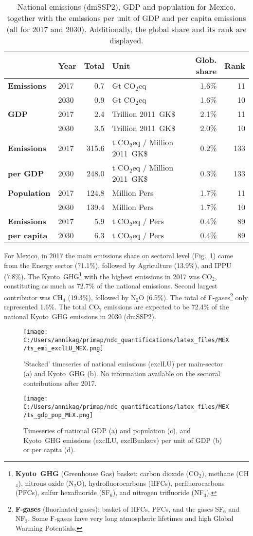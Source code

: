 \documentclass[12pt]{article}
\begin{document}
 \begin{table}[htbp]
 \centering
 \caption{National emissions (dmSSP2), GDP and population for Mexico, together with the emissions per unit of GDP and per capita emissions (all for 2017 and 2030). 
 Additionally, the global share and its rank are displayed.}
 \label{tab:overview}
 \begin{tabular}{l || l r l r r}
 \bfseries  & \bfseries Year & \bfseries Total & \bfseries Unit & \bfseries Glob. share & \bfseries Rank \tabularnewline \hline \hline
 \bfseries Emissions & 2017 & 0.7 & Gt CO$_2$eq & 1.6\% & 11 \tabularnewline 
 \bfseries  & 2030 & 0.9 & Gt CO$_2$eq & 1.6\% & 10 \tabularnewline \hline
 \bfseries GDP & 2017 & 2.4 & Trillion 2011~GK\$ & 2.1\% & 11 \tabularnewline 
 \bfseries  & 2030 & 3.5 & Trillion 2011~GK\$ & 2.0\% & 10 \tabularnewline \hline
 \bfseries Emissions & 2017 & 315.6 & t CO$_2$eq / Million 2011~GK\$ & 0.2\% & 133 \tabularnewline 
 \bfseries per GDP & 2030 & 248.0 & t CO$_2$eq / Million 2011~GK\$ & 0.3\% & 133 \tabularnewline \hline
 \bfseries Population & 2017 & 124.8 & Million Pers & 1.7\% & 11 \tabularnewline 
 \bfseries  & 2030 & 139.4 & Million Pers & 1.7\% & 10 \tabularnewline \hline
 \bfseries Emissions & 2017 & 5.9 & t CO$_2$eq /  Pers & 0.4\% & 89 \tabularnewline 
 \bfseries per capita & 2030 & 6.3 & t CO$_2$eq /  Pers & 0.4\% & 89 \tabularnewline 
 \end{tabular}
 \end{table}

 For Mexico, in 2017 the main emissions share on sectoral level (Fig.~\ref{fig:tsEmi}) came from the Energy sector (71.1\%), followed by Agriculture (13.9\%), and IPPU (7.8\%). 
 The Kyoto~GHG\footnote{\textbf{Kyoto~GHG} (Greenhouse Gas) basket: carbon dioxide (CO$_2$), methane (CH$_4$), nitrous oxide (N$_2$O), hydrofluorocarbons (HFCs), perfluorocarbons (PFCs), sulfur hexafluoride (SF$_6$), and nitrogen trifluoride (NF$_3$).} with the highest emissions in 2017 was CO$_2$, constituting as much as 72.7\% of the national emissions. 
 Second largest contributor was CH$_4$ (19.3\%), followed by N$_2$O (6.5\%). 
 The total of F-gases\footnote{\textbf{F-gases} (fluorinated gases): basket of HFCs, PFCs, and the gases SF$_6$ and NF$_3$. 
 Some F-gases have very long atmospheric lifetimes and high Global Warming Potentials.} only represented 1.6\%.
 The total CO$_2$ emissions are expected to be 72.4\% of the national Kyoto~GHG emissions in 2030 (dmSSP2).
 \begin{figure}[htbp]
 \centering
 \texttt{[image: C:/Users/annikag/primap/ndc\_quantifications/latex\_files/MEX/ts\_emi\_exclLU\_MEX.png]}
 \caption{'Stacked' timeseries of national emissions (exclLU) per main-sector (a) and Kyoto~GHG (b). 
 No information available on the sectoral contributions after 2017.}
 \label{fig:tsEmi}
 \end{figure}
 \begin{figure}[htbp]
 \centering
 \texttt{[image: C:/Users/annikag/primap/ndc\_quantifications/latex\_files/MEX/ts\_gdp\_pop\_MEX.png]}
 \caption{Timeseries of national GDP (a) and population (c), and Kyoto~GHG emissions (exclLU, exclBunkers) per unit of GDP (b) or per capita (d).}
 \label{fig:tsSocioEco}
 \end{figure}
\end{document}
